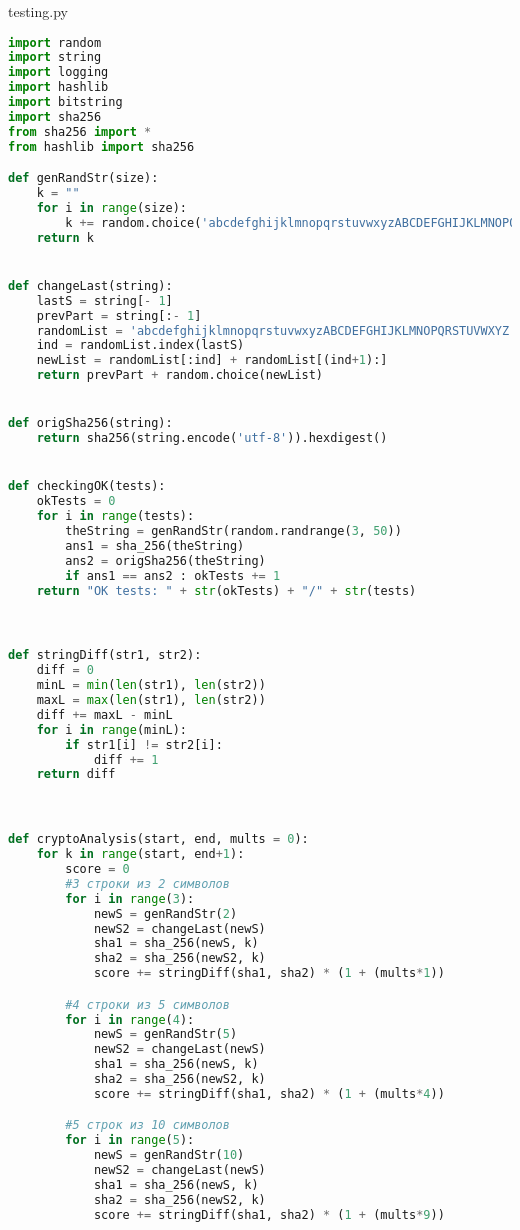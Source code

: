 \documentclass[12pt]{article}
\begin{document}
testing.py
\begin{lstlisting}[language=Python]
import random
import string
import logging
import hashlib
import bitstring
import sha256
from sha256 import *
from hashlib import sha256

def genRandStr(size):
    k = ""
    for i in range(size):
        k += random.choice('abcdefghijklmnopqrstuvwxyzABCDEFGHIJKLMNOPQRSTUVWXYZ')
    return k


def changeLast(string):
    lastS = string[- 1]
    prevPart = string[:- 1]
    randomList = 'abcdefghijklmnopqrstuvwxyzABCDEFGHIJKLMNOPQRSTUVWXYZ'
    ind = randomList.index(lastS)
    newList = randomList[:ind] + randomList[(ind+1):]
    return prevPart + random.choice(newList)


def origSha256(string):
    return sha256(string.encode('utf-8')).hexdigest()


def checkingOK(tests):
    okTests = 0
    for i in range(tests):
        theString = genRandStr(random.randrange(3, 50))
        ans1 = sha_256(theString)
        ans2 = origSha256(theString)
        if ans1 == ans2 : okTests += 1
    return "OK tests: " + str(okTests) + "/" + str(tests)



def stringDiff(str1, str2):
    diff = 0
    minL = min(len(str1), len(str2))
    maxL = max(len(str1), len(str2))
    diff += maxL - minL
    for i in range(minL):
        if str1[i] != str2[i]:
            diff += 1
    return diff



def cryptoAnalysis(start, end, mults = 0):
    for k in range(start, end+1):
        score = 0
        #3 строки из 2 символов
        for i in range(3):
            newS = genRandStr(2)
            newS2 = changeLast(newS)
            sha1 = sha_256(newS, k)
            sha2 = sha_256(newS2, k)
            score += stringDiff(sha1, sha2) * (1 + (mults*1))

        #4 строки из 5 символов
        for i in range(4):
            newS = genRandStr(5)
            newS2 = changeLast(newS)
            sha1 = sha_256(newS, k)
            sha2 = sha_256(newS2, k)
            score += stringDiff(sha1, sha2) * (1 + (mults*4))

        #5 строк из 10 символов
        for i in range(5):
            newS = genRandStr(10)
            newS2 = changeLast(newS)
            sha1 = sha_256(newS, k)
            sha2 = sha_256(newS2, k)
            score += stringDiff(sha1, sha2) * (1 + (mults*9))


\end{lstlisting}
\end{document}

